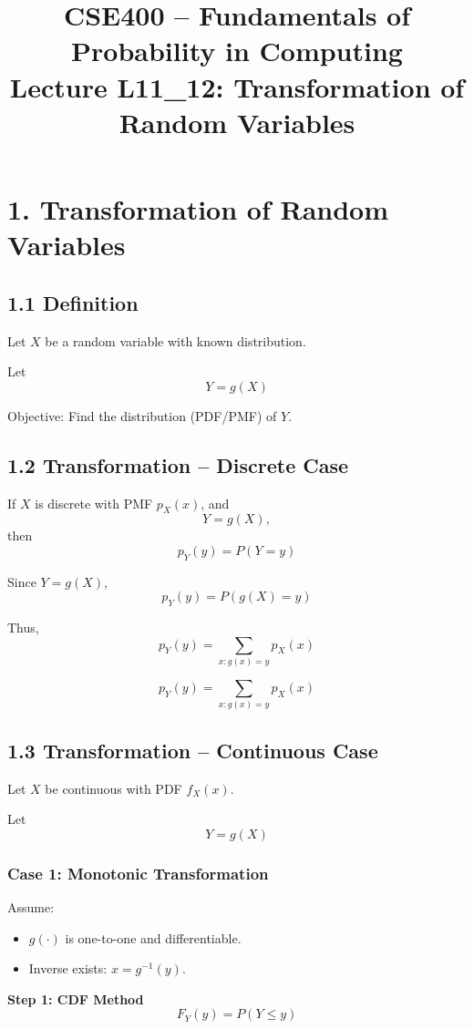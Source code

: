 \documentclass[12pt]{article}
\title{CSE400 -- Fundamentals of Probability in Computing\\
Lecture L11\_12: Transformation of Random Variables}
\date{}
\begin{document}
\maketitle

\section*{1. Transformation of Random Variables}

\subsection*{1.1 Definition}

Let $X$ be a random variable with known distribution.

Let
\[
Y = g(X)
\]

Objective: Find the distribution (PDF/PMF) of $Y$.

\subsection*{1.2 Transformation -- Discrete Case}

If $X$ is discrete with PMF $p_X(x)$, and
\[
Y = g(X),
\]
then
\[
p_Y(y) = P(Y = y)
\]

Since $Y = g(X)$,
\[
p_Y(y) = P(g(X) = y)
\]

Thus,
\[
p_Y(y) = \sum_{x: g(x)=y} p_X(x)
\]

\[
\boxed{
p_Y(y) = \sum_{x: g(x)=y} p_X(x)
}
\]

\subsection*{1.3 Transformation -- Continuous Case}

Let $X$ be continuous with PDF $f_X(x)$.

Let
\[
Y = g(X)
\]

\subsubsection*{Case 1: Monotonic Transformation}

Assume:
\begin{itemize}
    \item $g(\cdot)$ is one-to-one and differentiable.
    \item Inverse exists: $x = g^{-1}(y)$.
\end{itemize}

\textbf{Step 1: CDF Method}
\[
F_Y(y) = P(Y \le y)
\]
\end{document}

